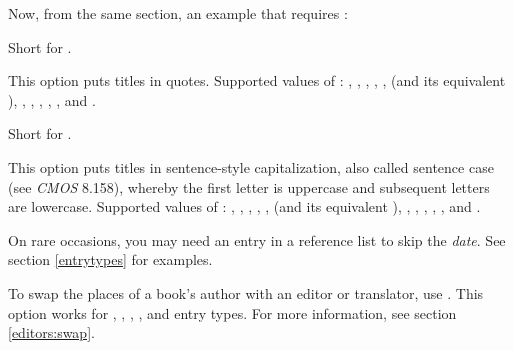 \documentclass[11pt,letterpaper,oneside]{article}
\begin{document}
\begin{optionlist}
\begin{refonly}
\nocite{maitland1998}
\end{refonly}

\noindent Now, from the same section, an example that requires
:

\begin{refonly}
\nocite{darwin1964}
\end{refonly}


\noindent Short for .


\noindent This option puts titles in quotes. Supported values of
: , ,
, , ,
 (and its equivalent ),
, , ,
, , and
.


\noindent Short for .


\noindent This option puts titles in sentence-style capitalization,
also called sentence case (see \textit{CMOS} 8.158), whereby the first
letter is uppercase and subsequent letters are lowercase. Supported
values of : , ,
, , ,
 (and its equivalent ),
, , ,
, , and
.


\noindent On rare occasions, you may need an entry in a reference list
to skip the \textit{date}. See section \ref{entrytypes} for examples.


\noindent To swap the places of a book's author with an editor or
translator, use . This option works for ,
, , , and
 entry types. For more information, see section
\ref{editors:swap}.


\end{optionlist}
\end{document}
